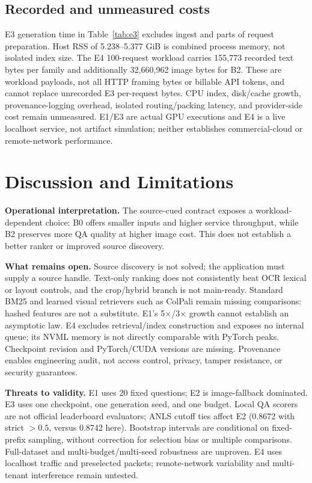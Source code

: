 ﻿\documentclass[conference]{IEEEtran}
\newcommand{\bzero}{\textsc{B0}\xspace}
\newcommand{\btwo}{\textsc{B2}\xspace}
\begin{document}
\subsection{Recorded and unmeasured costs}
E3 generation time in Table~\ref{tab:e3} excludes ingest and parts of request preparation. Host RSS of 5.238--5.377 GiB is combined process memory, not isolated index size. The E4 100-request workload carries 155,773 recorded text bytes per family and additionally 32,660,962 image bytes for \btwo. These are workload payloads, not all HTTP framing bytes or billable API tokens, and cannot replace unrecorded E3 per-request bytes. CPU index, disk/cache growth, provenance-logging overhead, isolated routing/packing latency, and provider-side cost remain unmeasured. E1/E3 are actual GPU executions and E4 is a live localhost service, not artifact simulation; neither establishes commercial-cloud or remote-network performance.

\section{Discussion and Limitations}
\textbf{Operational interpretation.} The source-cued contract exposes a workload-dependent choice: \bzero offers smaller inputs and higher service throughput, while \btwo preserves more QA quality at higher image cost. This does not establish a better ranker or improved source discovery.

\textbf{What remains open.} Source discovery is not solved; the application must supply a source handle. Text-only ranking does not consistently beat OCR lexical or layout controls, and the crop/hybrid branch is not main-ready. Standard BM25 and learned visual retrievers such as ColPali remain missing comparisons: hashed features are not a substitute. E1's 5$\times$/3$\times$ growth cannot establish an asymptotic law. E4 excludes retrieval/index construction and exposes no internal queue; its NVML memory is not directly comparable with PyTorch peaks. Checkpoint revision and PyTorch/CUDA versions are missing. Provenance enables engineering audit, not access control, privacy, tamper resistance, or security guarantees.

\textbf{Threats to validity.} E1 uses 20 fixed questions; E2 is image-fallback dominated. E3 uses one checkpoint, one generation seed, and one budget. Local QA scorers are not official leaderboard evaluators; ANLS cutoff ties affect E2 (0.8672 with strict $>0.5$, versus 0.8742 here). Bootstrap intervals are conditional on fixed-prefix sampling, without correction for selection bias or multiple comparisons. Full-dataset and multi-budget/multi-seed robustness are unproven. E4 uses localhost traffic and preselected packets; remote-network variability and multi-tenant interference remain untested.
\end{document}
